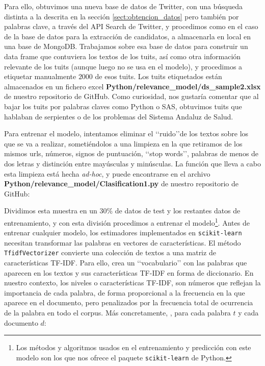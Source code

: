 Para ello, obtuvimos una nueva base de datos de Twitter, con una búsqueda distinta
a la descrita en la sección \ref{sect:obtencion_datos} pero también por palabras clave,
a través del API Search de Twitter, y procedimos como en el caso
de la base de datos para la extracción de candidatos, a almacenarla en local en una base de MongoDB.
Trabajamos sobre esa base de datos para construir un data frame que contuviera los textos de los tuits,
así como otra información relevante de los tuits (aunque luego no se usa en el modelo), y procedimos
a etiquetar manualmente $2000$ de esos tuits. Los tuits etiquetados están almacenados en un fichero
excel {\bf Python/relevance\_model/ds\_sample2.xlsx} de nuestro repositorio de GitHub.
Como curiosidad, nos gustaría comentar que al bajar los tuits por palabras claves como Python o SAS, 
obtuvimos tuits que hablaban de serpientes o de los problemas del Sistema Andaluz de Salud. 

Para entrenar el modelo, intentamos eliminar el \lq\lq ruido\rq\rq de los textos 
sobre los que se va a realizar, sometiéndolos a una limpieza en la que retiramos
de los mismos urls, números, signos de puntuación, \lq\lq stop words\rq\rq, palabras de menos
de dos letras y distinción entre mayúsculas y minúsculas.
La función que lleva a cabo esta limpieza está hecha {\em ad-hoc}, y puede encontrarse en el
archivo {\bf Python/relevance\_model/Clasification1.py} de nuestro repositorio de GitHub:


Dividimos esta muestra en un $30$\% de datos de test y los restantes datos de entrenamiento,
y con esta división procedimos a entrenar el modelo\footnote{Los métodos y algoritmos usados 
en el entrenamiento y predicción con este modelo son
los que nos ofrece el paquete {\tt  scikit-learn} de Python.}.
Antes de entrenar cualquier modelo, los estimadores implementados en {\tt  scikit-learn}
necesitan transformar las palabras en vectores de características.
El método {\tt TfidfVectorizer} convierte una colección de textos
a una matriz de características TF-IDF. Para ello, crea un  \lq\lq vocabulario\rq\rq 
con las palabras que aparecen en los textos y sus características TF-IDF en forma de diccionario.
En nuestro contexto, los niveles o características TF-IDF, son números que reflejan la 
importancia de cada palabra, de forma proporcional a la frecuencia en la que
aparece en el documento, pero  penalizados por la frecuencia total de ocurrencia 
de la palabra en todo el corpus. Más concretamente, \cite{notas_alvaro}, 
para cada palabra $t$ y cada documento $d$:

